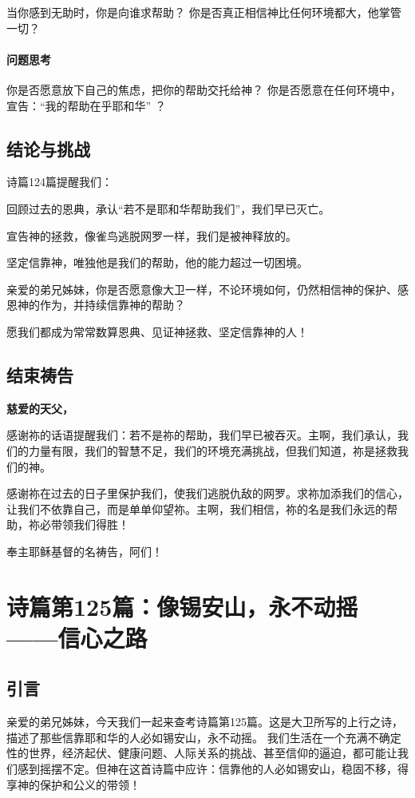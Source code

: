 \documentclass[a4paper, 12pt]{article}
\begin{document}
当你感到无助时，你是向谁求帮助？
你是否真正相信神比任何环境都大，他掌管一切？
\paragraph*{问题思考}

你是否愿意放下自己的焦虑，把你的帮助交托给神？
你是否愿意在任何环境中，宣告：“我的帮助在乎耶和华” ？
\subsection*{结论与挑战}
诗篇124篇提醒我们：

回顾过去的恩典，承认“若不是耶和华帮助我们”，我们早已灭亡。

宣告神的拯救，像雀鸟逃脱网罗一样，我们是被神释放的。

坚定信靠神，唯独他是我们的帮助，他的能力超过一切困境。

亲爱的弟兄姊妹，你是否愿意像大卫一样，不论环境如何，仍然相信神的保护、感恩神的作为，并持续信靠神的帮助？

愿我们都成为常常数算恩典、见证神拯救、坚定信靠神的人！

\subsection*{结束祷告}
\textbf{慈爱的天父，}

感谢祢的话语提醒我们：若不是祢的帮助，我们早已被吞灭。主啊，我们承认，我们的力量有限，我们的智慧不足，我们的环境充满挑战，但我们知道，祢是拯救我们的神。

感谢祢在过去的日子里保护我们，使我们逃脱仇敌的网罗。求祢加添我们的信心，让我们不依靠自己，而是单单仰望祢。主啊，我们相信，祢的名是我们永远的帮助，祢必带领我们得胜！

奉主耶稣基督的名祷告，阿们！
\newpage
\section{诗篇第125篇：像锡安山，永不动摇——信心之路}
\subsection*{引言}
亲爱的弟兄姊妹，今天我们一起来查考诗篇第125篇。这是大卫所写的上行之诗，描述了那些信靠耶和华的人必如锡安山，永不动摇。
我们生活在一个充满不确定性的世界，经济起伏、健康问题、人际关系的挑战、甚至信仰的逼迫，都可能让我们感到摇摆不定。但神在这首诗篇中应许：信靠他的人必如锡安山，稳固不移，得享神的保护和公义的带领！
\end{document}
